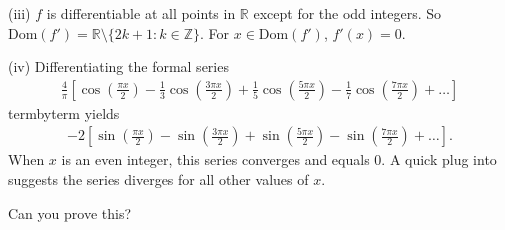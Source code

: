 \documentclass[letterpaper,10pt,english]{jupyterBook}
\begin{document}
\sphinxAtStartPar
(iii) \(f\) is differentiable at all points in \(\mathbb{R}\) except for the odd integers. So \(\text{Dom}(f') = \mathbb{R}\setminus\{2k+1:k\in\mathbb{Z}\}\). For \(x\in\text{Dom}(f')\), \(f'(x)=0\).

\sphinxAtStartPar
(iv) Differentiating the formal series
\begin{equation*}
\begin{split}
\frac{4}{\pi}\left[\cos\left(\frac{\pi x}{2}\right)-\frac{1}{3}\cos\left(\frac{3\pi x}{2}\right)+\frac{1}{5}\cos\left(\frac{5\pi x}{2}\right)-\frac{1}{7}\cos\left(\frac{7\pi x}{2}\right)+\ldots\right]
\end{split}
\end{equation*}
\sphinxAtStartPar
term\sphinxhyphen{}by\sphinxhyphen{}term yields
\begin{equation*}
\begin{split}
-2\left[\sin\left(\frac{\pi x}{2}\right)-\sin\left(\frac{3\pi x}{2}\right)+\sin\left(\frac{5\pi x}{2}\right)-\sin\left(\frac{7\pi x}{2}\right)+\ldots\right].
\end{split}
\end{equation*}
\sphinxAtStartPar
When \(x\) is an even integer, this series converges and equals \(0\). A quick plug into  suggests the series diverges for all other values of \(x\).

\sphinxAtStartPar
{} Can you prove this?
\end{document}
